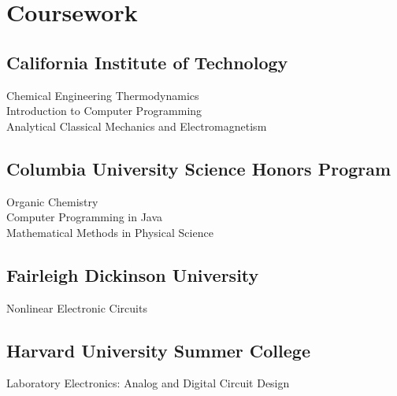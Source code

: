 \documentclass[letterpaper]{deedy-resume} %
\begin{document}
\begin{minipage}[t]{0.39\textwidth}
\section{Coursework}

\subsection{California Institute of \newline Technology}
Chemical Engineering Thermodynamics\\
Introduction to Computer Programming\\
Analytical Classical Mechanics and Electromagnetism\\

\sectionspace 

\subsection{Columbia University Science Honors Program}
Organic Chemistry \\
Computer Programming in Java \\
Mathematical Methods in Physical Science \\

\sectionspace %


\subsection{Fairleigh Dickinson University}
Nonlinear Electronic Circuits \\

\sectionspace %


\subsection{Harvard University Summer College}
Laboratory Electronics: Analog and Digital Circuit Design \\

\sectionspace %



\end{minipage}
\end{document}
